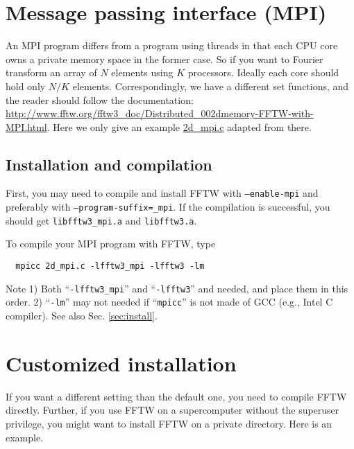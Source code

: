\documentclass[12pt]{article}
\begin{document}
\section{Message passing interface (MPI)}

An MPI program differs from a program using threads
in that each CPU core owns a private memory space in the former case.
%
So if you want to Fourier transform an array of $N$ elements
using $K$ processors.
%
Ideally each core should hold only $N/K$ elements.
%
Correspondingly, we have a different set functions,
%
and the reader should follow the documentation:
\url{http://www.fftw.org/fftw3_doc/Distributed_002dmemory-FFTW-with-MPI.html}.
%
Here we only give an example \url{2d_mpi.c} adapted from there.






\subsection{Installation and compilation}

First, you may need to compile and install FFTW
  with \texttt{--enable-mpi}
  and preferably with \texttt{--program-suffix=\_mpi}.
%
If the compilation is successful,
  you should get \texttt{libfftw3\_mpi.a}
  and \texttt{libfftw3.a}.

To compile your MPI program with FFTW, type
\begin{verbatim}
  mpicc 2d_mpi.c -lfftw3_mpi -lfftw3 -lm
\end{verbatim}
%
Note
1) Both ``\texttt{-lfftw3\_mpi}'' and ``\texttt{-lfftw3}''
  and needed, and place them in this order.
%
2) ``\texttt{-lm}'' may not needed if
``\texttt{mpicc}'' is not made of GCC (e.g., Intel C compiler).
See also Sec. \ref{sec:install}.





\section{\label{sec:install}Customized installation}


If you want a different setting than the default one,
  you need to compile FFTW directly.
Further, if you use FFTW on a supercomputer
  without the superuser privilege,
  you might want to install FFTW on a private directory.
Here is an example.
\end{document}
